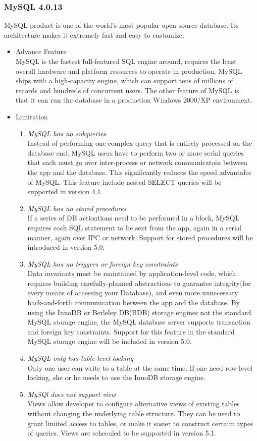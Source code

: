 \documentclass[11pt]{article}
\begin{document}
\subsubsection{MySQL 4.0.13}
MySQL product is one of the world's most popular open source database. Its architecture makes it extremely fast and easy to customize.
\begin{itemize}
\item Advance Feature\\
MySQL is the fastest full-featured SQL engine around, requires the least overall hardware and platform resources to operate in production. MySQL ships with a high-capacity engine, which can support tens of millions of records and hundreds of concurrent users. The other feature of MySQL is that it can run the database in a production Windows 2000/XP environment.

\item Limitation
\begin{enumerate}
\item \emph{MySQL has no subqueries}\\
Instead of performing one complex query that is entirely processed on the database end, MySQL users have to perform two or more serial queries that each must go over inter-process or network communicatoin between the app and the database. This significantly reduces the speed advantafes of MySQL. This feature include nested SELECT queries will be supported in version 4.1.
\item \emph{MySQL has no stored procedures}\\
If a series of DB actiontions need to be performed in a block, MySQL requires each SQL statement to be sent from the app, again in a serial manner, again over IPC or network. Support for stored procedures will be introduced in version 5.0.
\item \emph{MySQL has no triggers or foreign key constraints}\\
Data invariants must be maintained by application-level code, which requires building carefully-planned abstractions to guarantee integrity(for every means of accessing your Database), and even more unnecessary back-and-forth communication between the app and the database. By using the InnoDB or Berleley DB(BDB) storage engines not the standard MySQL storage engine, the MySQL database server supports transaction and foreign key constraints. Support for this feature in the standard MySQL storage engine will be included in version 5.0. 
\item \emph{MySQL only has table-level locking}\\
Only one user can write to a table at the same time. If one need row-level locking, she or he needs to use the InnoDB storage engine.
\item \emph{MySQl does not support view}\\
Views allow developer to configure alternative views of existing tables without changing the underlying table structure. They can be used to grant limited access to tables, or make it easier to construct certaim types of queries. Views are scheculed to be supported in version 5.1.
\end{enumerate}


\end{itemize}
\end{document}
